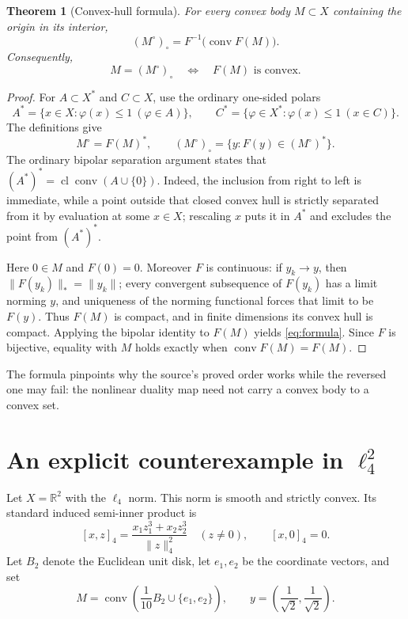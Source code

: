 \documentclass[11pt]{article}
\newcommand{\R}{\mathbb R}
\newcommand{\conv}{\operatorname{conv}}
\newcommand{\cl}{\operatorname{cl}}
\newtheorem{theorem}{Theorem}
\begin{document}
\begin{theorem}[Convex-hull formula]\label{thm:formula}
For every convex body $M\subset X$ containing the origin in its interior,
\begin{equation}\label{eq:formula}
 (M^\circ)_\circ=F^{-1}\!\bigl(\conv F(M)\bigr).
\end{equation}
Consequently,
\[
 M=(M^\circ)_\circ \quad\Longleftrightarrow\quad F(M)\text{ is convex}.
\]
\end{theorem}

\begin{proof}
For $A\subset X^*$ and $C\subset X$, use the ordinary one-sided polars
\[
 A^*=\{x\in X:\varphi(x)\leq1\ (\varphi\in A)\},\qquad
 C^*=\{\varphi\in X^*:\varphi(x)\leq1\ (x\in C)\}.
\]
The definitions give
\[
 M^\circ=F(M)^*,
 \qquad
 (M^\circ)_\circ=\{y:F(y)\in(M^\circ)^*\}.
\]
The ordinary bipolar separation argument states that
$(A^*)^*=\cl\conv(A\cup\{0\})$.  Indeed, the inclusion from right to left
is immediate, while a point outside that closed convex hull is strictly
separated from it by evaluation at some $x\in X$; rescaling $x$ puts it in
$A^*$ and excludes the point from $(A^*)^*$.

Here $0\in M$ and $F(0)=0$.  Moreover $F$ is continuous: if $y_k\to y$,
then $\|F(y_k)\|_*=\|y_k\|$; every convergent subsequence of $F(y_k)$ has a
limit norming $y$, and uniqueness of the norming functional forces that
limit to be $F(y)$.  Thus $F(M)$ is compact, and in finite dimensions its
convex hull is compact.  Applying the bipolar identity to $F(M)$ yields
\eqref{eq:formula}.  Since $F$ is bijective, equality with $M$ holds exactly
when $\conv F(M)=F(M)$.
\end{proof}

The formula pinpoints why the source's proved order works while the reversed
one may fail: the nonlinear duality map need not carry a convex body to a
convex set.

\section{An explicit counterexample in \texorpdfstring{$\ell_4^2$}{ell-4 squared}}

Let $X=\R^2$ with the $\ell_4$ norm.  This norm is smooth and strictly
convex.  Its standard induced semi-inner product is
\begin{equation}\label{eq:sip}
 [x,z]_4=
 \frac{x_1z_1^3+x_2z_2^3}{\|z\|_4^2}
 \quad(z\ne0),
 \qquad [x,0]_4=0.
\end{equation}
Let $B_2$ denote the Euclidean unit disk, let $e_1,e_2$ be the coordinate
vectors, and set
\begin{equation}\label{eq:M}
 M=\conv\!\left(\frac1{10}B_2\cup\{e_1,e_2\}\right),
 \qquad
 y=\left(\frac1{\sqrt2},\frac1{\sqrt2}\right).
\end{equation}
\end{document}
